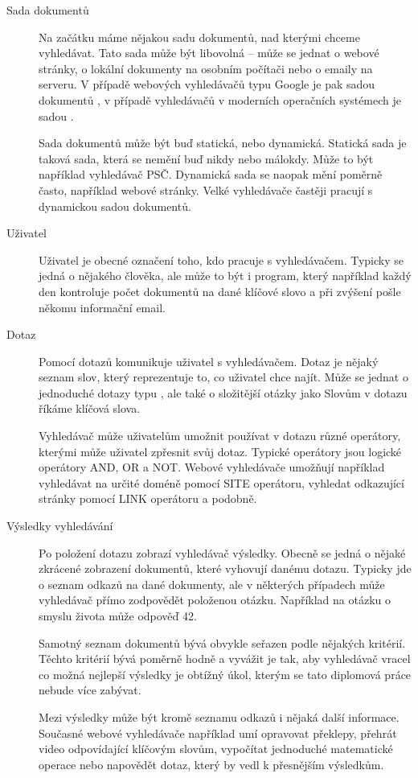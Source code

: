 \documentclass[12pt]{article}
\begin{document}
\begin{description}
\item[Sada dokumentů] Na začátku máme nějakou sadu dokumentů, nad kterými chceme vyhledávat. Tato sada může být libovolná -- může se jednat o webové stránky, o lokální dokumenty na osobním počítači nebo o emaily na serveru. V případě webových vyhledávačů typu Google je pak sadou dokumentů , v případě vyhledávačů v moderních operačních systémech je sadou . 

Sada dokumentů může být buď statická, nebo dynamická. Statická sada je taková sada, která se nemění buď nikdy nebo málokdy. Může to být například vyhledávač PSČ. Dynamická sada se naopak mění poměrně často, například webové stránky. Velké vyhledávače častěji pracují s dynamickou sadou dokumentů. 

\item[Uživatel] Uživatel je obecné označení toho, kdo pracuje s vyhledávačem. Typicky se jedná o nějakého člověka, ale může to být i program, který například každý den kontroluje počet dokumentů na dané klíčové slovo a při zvýšení pošle někomu informační email. 

\item[Dotaz] Pomocí dotazů komunikuje uživatel s vyhledávačem. Dotaz je nějaký seznam slov, který reprezentuje to, co uživatel chce najít. Může se jednat o jednoduché dotazy typu , ale také o složitější otázky jako  Slovům v dotazu říkáme klíčová slova. 

Vyhledávač může uživatelům umožnit používat v dotazu různé operátory, kterými může uživatel zpřesnit svůj dotaz. Typické operátory jsou logické operátory AND, OR a NOT. Webové vyhledávače umožňují například vyhledávat na určité doméně pomocí SITE operátoru, vyhledat odkazující stránky pomocí LINK operátoru a podobně. 

\item[Výsledky vyhledávání] Po položení dotazu zobrazí vyhledávač výsledky. Obecně se jedná o nějaké zkrácené zobrazení dokumentů, které vyhovují danému dotazu. Typicky jde o seznam odkazů na dané dokumenty, ale v některých případech může vyhledávač přímo zodpovědět položenou otázku. Například na otázku o smyslu života může odpověď 42. 

Samotný seznam dokumentů bývá obvykle seřazen podle nějakých kritérií. Těchto kritérií bývá poměrně hodně a vyvážit je tak, aby vyhledávač vracel co možná nejlepší výsledky je obtížný úkol, kterým se tato diplomová práce nebude více zabývat. 

Mezi výsledky může být kromě seznamu odkazů i nějaká další informace. Současné webové vyhledávače například umí opravovat překlepy, přehrát video odpovídající klíčovým slovům, vypočítat jednoduché matematické operace nebo napovědět dotaz, který by vedl k přesnějším výsledkům. 
\end{description}
\end{document}
